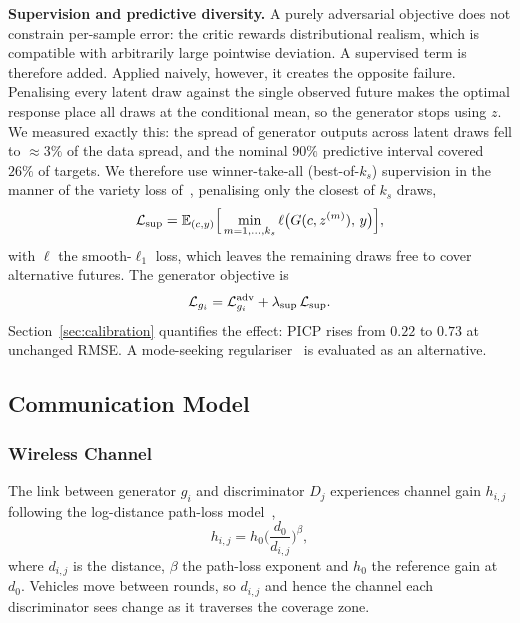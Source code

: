 \documentclass[journal]{IEEEtran}
\begin{document}
\textbf{Supervision and predictive diversity.} A purely adversarial objective
does not constrain per-sample error: the critic rewards distributional realism,
which is compatible with arbitrarily large pointwise deviation. A supervised
term is therefore added. Applied naively, however, it creates the opposite
failure. Penalising every latent draw against the single observed future makes
the optimal response place all draws at the conditional mean, so the generator
stops using $z$. We measured exactly this: the spread of generator outputs
across latent draws fell to $\approx3\%$ of the data spread, and the nominal
$90\%$ predictive interval covered $26\%$ of targets. We therefore use
winner-take-all (best-of-$k_s$) supervision in the manner of the variety loss
of~\cite{gupta2018socialgan}, penalising only the closest of $k_s$ draws,
\begin{equation}
\mathcal{L}_{\rm sup}=\mathbb{E}_{(c,y)}\Big[\min_{m=1,\ldots,k_s}
 \ell\big(G(c,z^{(m)}),\,y\big)\Big],
\label{eq:sup}
\end{equation}
with $\ell$ the smooth-$\ell_1$ loss, which leaves the remaining draws free to
cover alternative futures. The generator objective is
\begin{equation}
\mathcal{L}_{g_i}=\mathcal{L}^{\rm adv}_{g_i}+\lambda_{\rm sup}\,\mathcal{L}_{\rm sup}.
\label{eq:gloss}
\end{equation}
Section~\ref{sec:calibration} quantifies the effect: PICP rises from $0.22$ to
$0.73$ at unchanged RMSE. A mode-seeking regulariser~\cite{mao2019msgan} is
evaluated as an alternative.

\subsection{Communication Model}
\subsubsection{Wireless Channel}
The link between generator $g_i$ and discriminator $D_j$ experiences channel
gain $h_{i,j}$ following the log-distance path-loss model~\cite{rappaport2002wireless},
\begin{equation}
h_{i,j}=h_0\Big(\frac{d_0}{d_{i,j}}\Big)^{\beta},
\label{eq:pathloss}
\end{equation}
where $d_{i,j}$ is the distance, $\beta$ the path-loss exponent and $h_0$ the
reference gain at $d_0$. Vehicles move between rounds, so $d_{i,j}$ and hence
the channel each discriminator sees change as it traverses the coverage zone.
\end{document}
